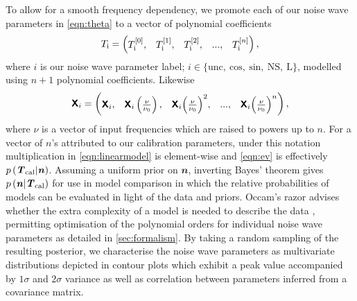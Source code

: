 To allow for a smooth frequency dependency, we promote each of our noise wave parameters in \cref{eqn:theta} to a vector of polynomial coefficients
\begin{equation}
    T_{\mathrm{i}} = \begin{pmatrix}
    T_{\mathrm{i}}^{[0]}, & T_{\mathrm{i}}^{[1]}, & T_{\mathrm{i}}^{[2]}, & ..., & T_{\mathrm{i}}^{[n]}
    \end{pmatrix},
\end{equation}
where $i$ is our noise wave parameter label; $i \in \{\mathrm{unc, \ cos, \ sin , \ NS, \ L}\}$, modelled using $n+1$ polynomial coefficients. Likewise
\begin{equation}
    \textbf{\textsf{X}}_{i} = \begin{pmatrix}
    \textbf{\textsf{X}}_{i}, & \textbf{\textsf{X}}_{i}\left(\frac{\nu}{\nu_0}\right), & \textbf{\textsf{X}}_{i}{\left(\frac{\nu}{\nu_0}\right)}^2, & ..., &  \textbf{\textsf{X}}_{i}{\left(\frac{\nu}{\nu_0}\right)}^{n}
    \end{pmatrix},
\end{equation}
where $\nu$ is a vector of input frequencies which are raised to powers up to $n$. For a vector of $n$'s attributed to our calibration parameters, under this notation multiplication in \cref{eqn:linearmodel} is element-wise and \cref{eqn:ev} is effectively $p\left(\textbf{\textit{T}}_{\mathrm{cal}}|\textbf{\textit{n}}\right)$. Assuming a uniform prior on $\mathbfit{n}$, inverting Bayes' theorem gives $p\left(\textbf{\textit{n}}|\textbf{\textit{T}}_{\mathrm{cal}}\right)$ for use in model comparison in which the relative probabilities of models can be evaluated in light of the data and priors. Occam’s razor advises whether the extra complexity of a model is needed to describe the data \citep{trotta}, permitting optimisation of the polynomial orders for individual noise wave parameters as detailed in \cref{sec:formalism}. By taking a random sampling of the resulting posterior, we characterise the noise wave parameters as multivariate distributions depicted in contour plots which exhibit a peak value accompanied by $1\sigma$ and $2\sigma$ variance as well as correlation between parameters inferred from a covariance matrix.

